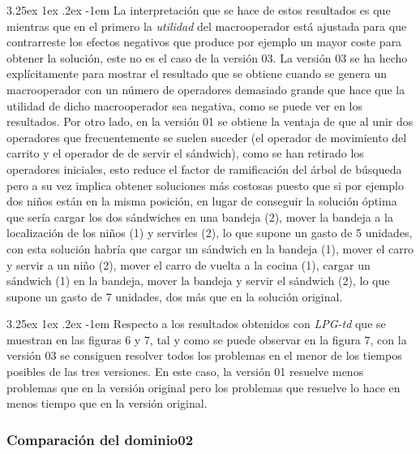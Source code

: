 \documentclass{article}
\makeatletter
\renewcommand\paragraph{\@startsection{paragraph}{5}{\z@}%
      {3.25ex \@plus1ex \@minus.2ex}%
      {-1em}%
      {\normalfont\normalsize\bfseries}}
\makeatother
\begin{document}
    \paragraph{}
    La interpretación que se hace de estos resultados es que mientras que en el primero la \textit{utilidad} del macrooperador está ajustada para que contrarreste los efectos negativos que produce por ejemplo un mayor coste para obtener la solución, este no es el caso de la versión 03. La versión 03 se ha hecho explícitamente para mostrar el resultado que se obtiene cuando se genera un macrooperador con un número de operadores demasiado grande que hace que la utilidad de dicho macrooperador sea negativa, como se puede ver en los resultados. Por otro lado, en la versión 01 se obtiene la ventaja de que al unir dos operadores que frecuentemente se suelen suceder (el operador de movimiento del carrito y el operador de de servir el sándwich), como se han retirado los operadores iniciales, esto reduce el factor de ramificación del árbol de búsqueda pero a su vez implica obtener soluciones más costosas puesto que si por ejemplo dos niños están en la misma posición, en lugar de conseguir la solución óptima que sería cargar los dos sándwiches en una bandeja (2), mover la bandeja a la localización de los niños (1) y servirles (2), lo que supone un gasto de 5 unidades, con esta solución habría que cargar un sándwich en la bandeja (1), mover el carro y servir a un niño (2), mover el carro de vuelta a la cocina (1), cargar un sándwich (1) en la bandeja, mover la bandeja y servir el sándwich (2), lo que supone un gasto de 7 unidades, dos más que en la solución original.
    
    \paragraph{}
    Respecto a los resultados obtenidos con \textit{LPG-td} que se muestran en las figuras 6 y 7, tal y como se puede observar en la figura 7, con la versión 03 se consiguen resolver todos los problemas en el menor de los tiempos posibles de las tres versiones. En este caso, la versión 01 resuelve menos problemas que en la versión original pero los problemas que resuelve lo hace en menos tiempo que en la versión original.
    
    \subsubsection{Comparación del dominio02}
    
\end{document}
